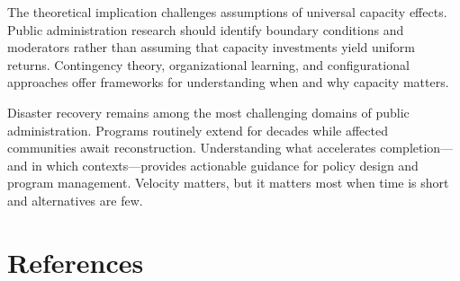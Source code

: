 \documentclass[
  12pt,
  letterpaper,
]{article}
\begin{document}
The theoretical implication challenges assumptions of universal capacity
effects. Public administration research should identify boundary
conditions and moderators rather than assuming that capacity investments
yield uniform returns. Contingency theory, organizational learning, and
configurational approaches offer frameworks for understanding when and
why capacity matters.

Disaster recovery remains among the most challenging domains of public
administration. Programs routinely extend for decades while affected
communities await reconstruction. Understanding what accelerates
completion---and in which contexts---provides actionable guidance for
policy design and program management. Velocity matters, but it matters
most when time is short and alternatives are few.

\section*{References}\label{references}
\end{document}
